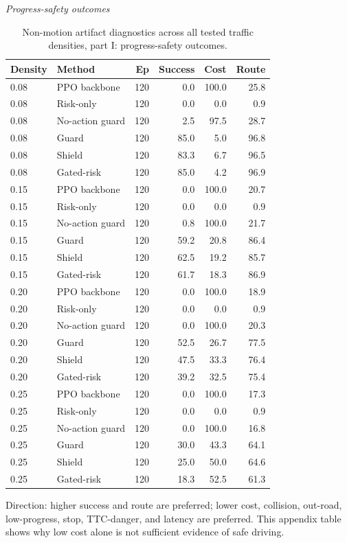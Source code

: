 \begin{table}[!htbp]
\centering
\caption{Non-motion artifact diagnostics across all tested traffic densities, part I: progress-safety outcomes.}
\label{tab_nonmotion_all_density}
\scriptsize
\setlength{\tabcolsep}{3.2pt}
\renewcommand{\arraystretch}{1.04}
\textit{Progress-safety outcomes}\par
\begin{tabular}{@{}llrrrr@{}}
\toprule
Density & Method & Ep & Success & Cost & Route \\
\midrule
0.08 & PPO backbone & 120 & 0.0 & 100.0 & 25.8 \\
0.08 & Risk-only & 120 & 0.0 & 0.0 & 0.9 \\
0.08 & No-action guard & 120 & 2.5 & 97.5 & 28.7 \\
0.08 & Guard & 120 & 85.0 & 5.0 & 96.8 \\
0.08 & Shield & 120 & 83.3 & 6.7 & 96.5 \\
0.08 & Gated-risk & 120 & 85.0 & 4.2 & 96.9 \\
0.15 & PPO backbone & 120 & 0.0 & 100.0 & 20.7 \\
0.15 & Risk-only & 120 & 0.0 & 0.0 & 0.9 \\
0.15 & No-action guard & 120 & 0.8 & 100.0 & 21.7 \\
0.15 & Guard & 120 & 59.2 & 20.8 & 86.4 \\
0.15 & Shield & 120 & 62.5 & 19.2 & 85.7 \\
0.15 & Gated-risk & 120 & 61.7 & 18.3 & 86.9 \\
0.20 & PPO backbone & 120 & 0.0 & 100.0 & 18.9 \\
0.20 & Risk-only & 120 & 0.0 & 0.0 & 0.9 \\
0.20 & No-action guard & 120 & 0.0 & 100.0 & 20.3 \\
0.20 & Guard & 120 & 52.5 & 26.7 & 77.5 \\
0.20 & Shield & 120 & 47.5 & 33.3 & 76.4 \\
0.20 & Gated-risk & 120 & 39.2 & 32.5 & 75.4 \\
0.25 & PPO backbone & 120 & 0.0 & 100.0 & 17.3 \\
0.25 & Risk-only & 120 & 0.0 & 0.0 & 0.9 \\
0.25 & No-action guard & 120 & 0.0 & 100.0 & 16.8 \\
0.25 & Guard & 120 & 30.0 & 43.3 & 64.1 \\
0.25 & Shield & 120 & 25.0 & 50.0 & 64.6 \\
0.25 & Gated-risk & 120 & 18.3 & 52.5 & 61.3 \\
\bottomrule
\end{tabular}
\begin{tablenotes}
\item Direction: higher success and route are preferred; lower cost, collision, out-road, low-progress, stop, TTC-danger, and latency are preferred. This appendix table shows why low cost alone is not sufficient evidence of safe driving.
\end{tablenotes}
\end{table}


